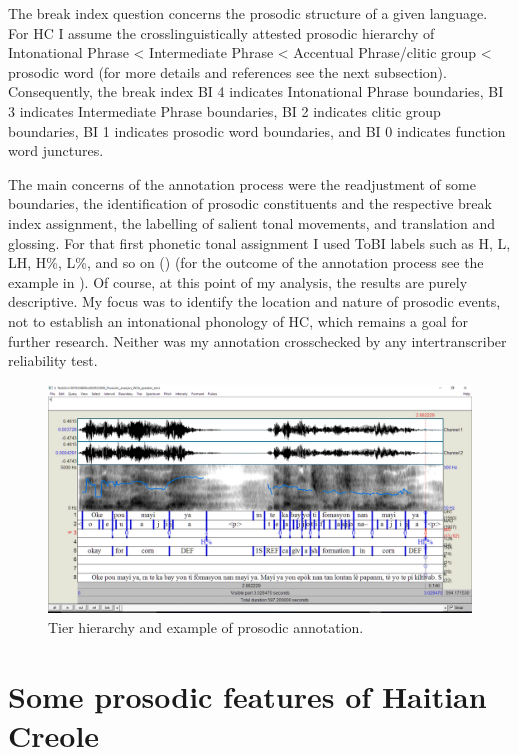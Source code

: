 \documentclass[output=paper]{langsci/langscibook}
\begin{document}
The break index question concerns the prosodic structure of a given language. For HC I assume the crosslinguistically attested prosodic hierarchy of Intonational Phrase < Intermediate Phrase < Accentual Phrase/clitic group < prosodic word (for more details and references see the next subsection). Consequently, the break index BI 4 indicates Intonational Phrase boundaries, BI 3 indicates Intermediate Phrase boundaries, BI 2 indicates clitic group boundaries, BI 1 indicates prosodic word boundaries, and BI 0 indicates function word junctures.

The main concerns of the annotation process were the readjustment of some boundaries, the identification of prosodic constituents and the respective break index assignment, the labelling of salient tonal movements, and translation and glossing. For that first phonetic tonal assignment I used ToBI labels such as H, L, LH, H\%, L\%, and so on (\citealt{Silverman1992,BeckmanAyers1994,Beckman2005}) (for the outcome of the annotation process see the example in ). Of course, at this point of my analysis, the results are purely descriptive. My focus was to identify the location and nature of prosodic events, not to establish an intonational phonology of HC, which remains a goal for further research. Neither was my annotation crosschecked by any intertranscriber reliability test.

\begin{figure}  
\includegraphics[width=\textwidth]{figures/KALPeerreviewedkorr-img3.png}
\caption{\label{fig:kal:3} Tier hierarchy and example of prosodic annotation.}
\end{figure}

\section{\label{sec:kal:4}Some prosodic features of Haitian Creole}
\end{document}

